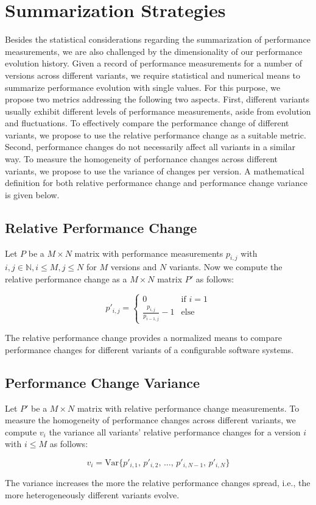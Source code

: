 \section{Summarization Strategies}\label{sec:summarization}
Besides the statistical considerations regarding the summarization of
performance measurements, we are also challenged by the dimensionality of our
performance evolution history. Given a record of performance measurements for a
number of versions across different variants, we require statistical and
numerical means to summarize performance evolution with single values. For this
purpose, we propose two metrics addressing the following two aspects. First,
different variants usually exhibit different levels of performance
measurements, aside from evolution and fluctuations. To effectively compare the
performance change of different variants, we propose to use the relative
performance change as a suitable metric. Second, performance changes do not
necessarily affect all variants in a similar way. To measure the homogeneity of
perfornance changes across different variants, we propose to use the variance
of changes per version. A mathematical definition for both relative performance
change and performance change variance is given below.

\subsection{Relative Performance Change}\label{sec:relativechange}
Let $P$ be a $M \times N$ matrix with performance measurements $p_{i, j}$ with
$i, j \in \mathbb{N}, i \leq M, j \leq N$ for $M$ versions and $N$ variants. Now
we compute the relative performance change as a $M \times N$ matrix $P'$ as
follows:

\begin{equation}
   p'_{i, j} =
   \begin{cases}
     0 & \text{if~} i = 1 \\
     \frac{p_{i, j}}{p_{i-1,j}} - 1 & \text{else} 
   \end{cases}
\end{equation}

The relative performance change provides a normalized means to compare
performance changes for different variants of a configurable software systems.

\subsection{Performance Change Variance}\label{sec:changevar}
Let $P'$ be a $M \times N$ matrix with relative performance change measurements.
To measure the homogeneity of performance changes across different variants, we
compute $v_i$ the variance all variants' relative performance changes for a
version $i$ with $i \leq M$ as follows:

\begin{equation}
   v_i = \text{Var}\lbrace p'_{i,1},\,p'_{i,2},\,\ldots,\,p'_{i,N-1},\,p'_{i,N}
   \rbrace
\end{equation}

The variance increases the more the relative performance changes spread, i.e.,
the more heterogeneously different variants evolve.
